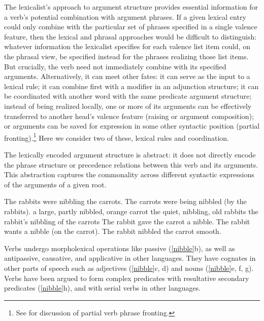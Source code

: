 \documentclass[output=paper
 	        ,biblatex
                ,babelshorthands
                ,newtxmath
                ,draftmode
                ,colorlinks, citecolor=brown
]{langscibook}
\begin{document}
The lexicalist’s approach to argument structure provides essential information for a verb's potential
combination with argument phrases.   If a given lexical entry could only  combine with the particular set of phrases specified in a single valence feature, then the lexical and phrasal approaches would be difficult to distinguish: whatever information the lexicalist specifies for each valence list item could, on the phrasal view, be specified instead for the phrases realizing those list items.  
But crucially, the verb need not immediately combine with its specified
arguments.  Alternatively, it can meet other fates: it can serve as the input to a lexical rule; it
can combine first with a modifier in an adjunction structure; it can be coordinated with another
word with the same predicate argument structure; instead of being realized locally, one or more of
its arguments can be effectively transferred to another head’s valence feature (raising or argument
composition); or arguments can be saved for expression in some other syntactic position (partial
fronting).\footnote{
See  for discussion of partial verb phrase fronting.
} Here we consider two of these, lexical rules and coordination.  
 
The lexically encoded argument structure is abstract: it does not directly encode the phrase structure or
precedence relations between this verb and its arguments. This abstraction captures the commonality
across different syntactic expressions of the arguments of a given root.

\begin{exe}
\ex \label{nibble}
\begin{xlist}
\ex  The rabbits were nibbling the carrots.  
\ex  The carrots were being nibbled (by the rabbits).
\ex  a large, partly nibbled, orange carrot 
\ex  the quiet, nibbling, old rabbits
\ex  the rabbit's nibbling of the carrots
\ex  The rabbit gave the carrot a nibble.  
\ex  The rabbit wants a nibble (on the carrot).  
\ex  The rabbit nibbled the carrot smooth.
\end{xlist}
\end{exe}

\noindent
Verbs undergo  morpholexical operations like passive
(\ref{nibble}b), as well as antipassive, causative, and applicative in other languages.  They have cognates in
other parts of speech such as adjectives  (\ref{nibble}c, d) and nouns  (\ref{nibble}e, f, g).  
Verbs have been argued to form complex predicates with resultative secondary predicates (\ref{nibble}h), and with serial verbs in other languages.   
\end{document}
